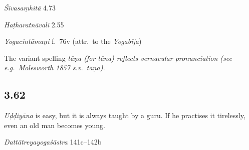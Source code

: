 \begin{ekdosis}
\begin{sources}[hp03_061]
\emph{Śivasaṃhitā} 4.73
\begin{versinnote}
\end{versinnote}
\end{sources}

\begin{testimonia}[hp03_061]
\emph{Haṭharatnāvalī} 2.55
\begin{versinnote}
\end{versinnote}

\emph{Yogacintāmaṇi} f.~76v (attr.~to the \emph{Yogabīja})
\begin{versinnote}
\end{versinnote}

\end{testimonia}

\begin{philcomm}[hp03_061]
The variant spelling \sl{tāṇa} (for \emph{tāna}) reflects vernacular pronunciation (see e.g.~Molesworth 1857 s.v.~\emph{tāṇa}). 
\end{philcomm}


\subsection*{3.62}
\begin{translation}[hp03_062]
\emph{Uḍḍiyāna} is easy, but it is always taught by a guru. If he practises it tirelessly, even an old man becomes young.
\end{translation}

\begin{sources}[hp03_062]
\emph{Dattātreyayogaśāstra} 141c–142b
\begin{versinnote}
\tl{\var{141d guruṇā ] guṇaughāt \pi}\\!}
\end{versinnote}
\end{sources}


\end{ekdosis}
